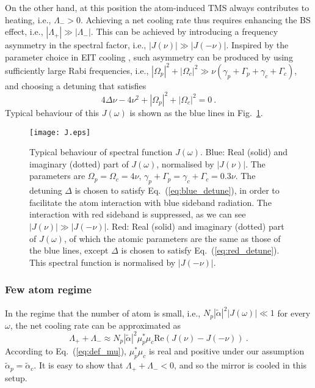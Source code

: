 \documentclass[aps, pra, reprint, amsmath, amssymb, groupedaddress, acknowledgments]{revtex4-1}
\begin{document}
On the other hand, at this position the atom-induced TMS always contributes to heating, i.e., $\Lambda_->0$.  Achieving a net cooling rate thus requires enhancing the BS effect, i.e., $|\Lambda_+| \gg |\Lambda_-|$.  This can be achieved by introducing a frequency asymmetry in the spectral factor, i.e., $|J(\nu)|\gg |J(-\nu)|$.  Inspired by the parameter choice in EIT cooling \cite{Morigi:2000wv, Morigi:2003cv}, such asymmetry can be produced by using sufficiently large Rabi frequencies, i.e., $|\Omega_p|^2+|\Omega_c|^2 \gg \nu (\gamma_p+\Gamma_p+\gamma_c+\Gamma_c)$, and choosing a detuning that satisfies
\begin{equation}\label{eq:blue_detune}
4\Delta \nu - 4 \nu^2 +  |\Omega_p|^2+|\Omega_c|^2 =0~.
\end{equation}
Typical behaviour of this $J(\omega)$ is shown as the blue lines in Fig.~\ref{fig:J}.

\begin{figure}
\begin{center}
\texttt{[image: J.eps]}
\caption{ \label{fig:J} Typical behaviour of spectral function $J(\omega)$.  Blue: Real (solid) and imaginary (dotted) part of $J(\omega)$, normalised by $|J(\nu)|$.  The parameters are $\Omega_p = \Omega_c=4 \nu$, $\gamma_p+\Gamma_p = \gamma_c+\Gamma_c = 0.3 \nu$.  The detuning $\Delta$ is chosen to satisfy Eq.~(\ref{eq:blue_detune}), in order to facilitate the atom interaction with blue sideband radiation.  The interaction with red sideband is suppressed, as we can see $|J(\nu)| \gg |J(-\nu)|$.  Red: Real (solid) and imaginary (dotted) part of $J(\omega)$, of which the atomic parameters are the same as those of the blue lines, except $\Delta$ is chosen to satisfy Eq.~(\ref{eq:red_detune}). 
This spectral function is normalised by $|J(-\nu)|$.}
\end{center}
\end{figure}


\subsubsection{Few atom regime}

In the regime that the number of atom is small, i.e., $N_p |\tilde{\alpha}|^2 |J(\omega)| \ll 1$ for every $\omega$, the net cooling rate can be approximated as
\begin{equation}\label{eq:Lambda_BS1}
\Lambda_+ + \Lambda_- \approx  N_p |\tilde{\alpha}|^2 \mu_p^\ast \mu_c \textrm{Re}(J(\nu)-J(-\nu))~.
\end{equation}
According to Eq.~(\ref{eq:def_mu}), $\mu_p^\ast \mu_c$ is real and positive under our assumption $\tilde{\alpha}_p = \tilde{\alpha}_c$.  It is easy to show that $\Lambda_+ + \Lambda_- <0$, and so the mirror is cooled in this setup.  
\end{document}

